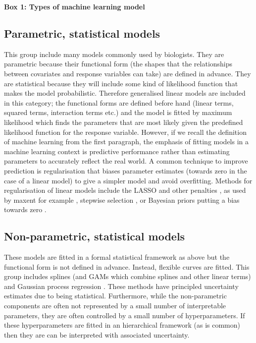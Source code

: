 \documentclass[10pt,]{article}
\begin{document}
\begin{figure*}[t]
\centering
\colorbox{boxcolour}{
\begin{minipage}{1\textwidth}


\setlength{\parindent}{3mm}
\noindent\textsf{\textbf{Box 1: Types of machine learning model}}\footnotesize

\vspace{-2mm}
\subsection{Parametric, statistical models}
This group include many models commonly used by biologists.
They are parametric because their functional form (the shapes that the relationships between covariates and response variables can take) are defined in advance.
They are statistical because they will include some kind of likelihood function that makes the model probabilistic.
Therefore generalised linear models are included in this category; the functional forms are defined before hand (linear terms, squared terms, interaction terms etc.) and the model is fitted by maximum likelihood which finds the parameters that are most likely given the predefined likelihood function for the response variable.
However, if we recall the definition of machine learning from the first paragraph, the emphasis of fitting models in a machine learning context is predictive performance rather than estimating parameters to accurately reflect the real world.
A common technique to improve prediction is regularisation that biases parameter estimates (towards zero in the case of a linear model) to give a simpler model and avoid overfitting.
Methods for regularisation of linear models include the LASSO and other penalties \citep{tibshirani1996regression, zou2005regularization, xu2017generalized, fan2001variable}, as used by maxent for example \citep{maxent}, stepwise selection \citep{hocking1976biometrics}, or Bayesian priors putting a bias towards zero \citep{park2008bayesian, liu2018bayesian, carvalho2009handling}.
\subsection{Non-parametric, statistical models}
These models are fitted in a formal statistical framework as above but the functional form is not defined in advance.
Instead, flexible curves are fitted.
This group includes splines (and GAMs which combine splines and other linear terms) and Gaussian process regression \citep{rasmussen2004gaussian}.
These methods have principled uncertainty estimates due to being statistical.
Furthermore, while the non-parametric components are often not represented by a small number of interpretable parameters, they are often controlled by a small number of hyperparameters.
If these hyperparameters are fitted in an hierarchical framework (as is common) then they are can be interpreted with associated uncertainty.

\end{minipage}}
\end{figure*}
\end{document}
